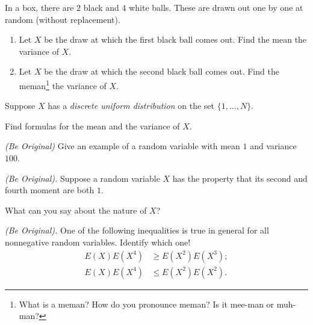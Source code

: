 \begin{problem}[Handout 7, \# 9]
  In a box, there are \(2\) black and \(4\) white balls. These are drawn
  out one by one at random (without replacement).
  \begin{enumerate}[label=(\alph*),noitemsep]
  \item Let \(X\) be the draw at which the first black ball comes out. Find
    the mean the variance of \(X\).
  \item Let \(X\) be the draw at which the second black ball comes
    out. Find the meman\footnote{What is a meman? How do you pronounce
      meman? Is it mee-man or muh-man?} the variance of \(X\).
  \end{enumerate}
\end{problem}
\begin{solution}

\end{solution}
\newpage

\begin{problem}[Handout 7, \# 10]
  Suppose \(X\) has a \emph{discrete uniform distribution} on the set
  \(\{1,\dotsc,N\}\).

  Find formulas for the mean and the variance of \(X\).
\end{problem}
\begin{solution}

\end{solution}
\newpage

\begin{problem}[Handout 7, \# 11]
  \emph{(Be Original)} Give an example of a random variable with mean
  \(1\) and variance \(100\).
\end{problem}
\begin{solution}

\end{solution}
\newpage

\begin{problem}[Handout 7, \# 13]
  \emph{(Be Original).} Suppose a random variable \(X\) has the property
  that its second and fourth moment are both \(1\).

  What can you say about the nature of \(X\)?
\end{problem}
\begin{solution}

\end{solution}
\newpage

\begin{problem}[Handout 7, \# 14]
  \emph{(Be Original).} One of the following inequalities is true in
  general for all nonnegative random variables. Identify which one!
  \begin{align*}
    E(X)E(X^4)&\geq E(X^2)E(X^3);\\
    E(X)E(X^4)&\leq E(X^2)E(X^2).
  \end{align*}
\end{problem}
\begin{solution}

\end{solution}
\newpage

